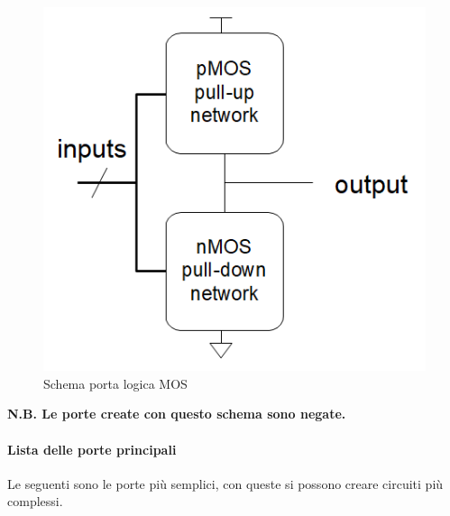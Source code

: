 \documentclass{article}
\begin{document}
\begin{figure}[ht]
    \centering
    \includegraphics[width=.55\linewidth]{MOS_schema.png}
    \caption{Schema porta logica MOS}
    \label{fig:porta_mos}
\end{figure}

\vspace{5pt}

\textbf{N.B. Le porte create con questo schema sono negate.}

\newpage

\paragraph{Lista delle porte principali}

Le seguenti sono le porte più semplici, con queste si possono creare circuiti più complessi.

\vspace{10pt}
\end{document}
